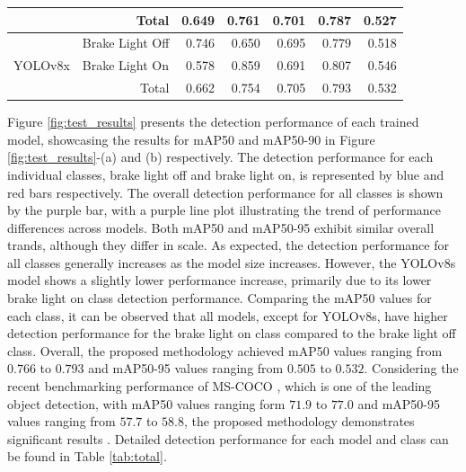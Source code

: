 \begin{table}[t!]
\begin{tabular}{llrrrrr}
                              & \multicolumn{1}{r}{Total} & 0.649 & 0.761 & 0.701 & 0.787                     & 0.527                      \\
    \midrule
    \multirow{3}{*}{YOLOv8x}  & Brake Light Off           & 0.746 & 0.650 & 0.695 & 0.779                     & 0.518                         \\
                              & Brake Light On            & 0.578 & 0.859 & 0.691 & 0.807                     & 0.546                        \\
                              & \multicolumn{1}{r}{Total} & 0.662 & 0.754 & 0.705 & 0.793                     & 0.532                      \\
    \bottomrule
    \end{tabular}%
\end{table}

Figure \ref{fig:test_results} presents the detection performance of each trained model, showcasing the results for mAP50 and mAP50-90 in Figure \ref{fig:test_results}-(a) and (b) respectively.
The detection performance for each individual classes, brake light off and brake light on, is represented by blue and red bars respectively. 
The overall detection performance for all classes is shown by the purple bar, with a purple line plot illustrating the trend of performance differences across models.
Both mAP50 and mAP50-95 exhibit similar overall trands, although they differ in scale.
As expected, the detection performance for all classes generally increases as the model size increases.
However, the YOLOv8s model shows a slightly lower performance increase, primarily due to its lower brake light on class detection performance.
Comparing the mAP50 values for each class, it can be observed that all models, except for YOLOv8s, have higher detection performance for the brake light on class compared to the brake light off class.
Overall, the proposed methodology achieved mAP50 values ranging from $0.766$ to $0.793$ and mAP50-95 values ranging from $0.505$ to $0.532$.
Considering the recent benchmarking performance of MS-COCO \cite{lin2014microsoft}, which is one of the leading object detection, with mAP50 values ranging form $71.9$ to $77.0$ and mAP50-95 values ranging from $57.7$ to $58.8$, the proposed methodology demonstrates significant results \cite{coco_benchmark, zou2023object}.
Detailed detection performance for each model and class can be found in Table \ref{tab:total}.

